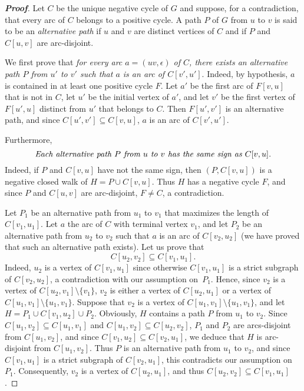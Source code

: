 \documentclass[11pt,a4paper]{article}
\def\e{\epsilon}
\begin{document}
\begin{proof}[{\bf Proof}]
Let $C$ be the unique negative cycle of $G$ and suppose, for a contradiction, that every arc of $C$ belongs to a positive cycle. A path $P$ of $G$ from $u$ to $v$ is said to be an {\em alternative path} if $u$ and $v$ are distinct vertices of $C$ and if $P$ and $C[u,v]$ are arc-disjoint. 

\medskip
We first prove that {\em for every arc $a=(uv,\e)$ of $C$, there exists an alternative path $P$ from $u'$ to $v'$ such that $a$ is an arc of $C[v',u']$}. Indeed, by hypothesis, $a$ is contained in at least one positive cycle $F$. Let $a'$ be the first arc of $F[v,u]$ that is not in $C$, let $u'$ be the initial vertex of $a'$, and let $v'$ be the first vertex of $F[u',u]$ distinct from $u'$ that belongs to $C$. Then $F[u',v']$ is an alternative path, and since $C[u',v']\subseteq C[v,u]$, $a$ is an arc of $C[v',u']$. 

\medskip
Furthermore, 
\begin{equation}\label{eq:sign}
{\text{\em Each alternative path $P$ from $u$ to $v$ has the same sign as $C[v,u]$.}}
\end{equation}
Indeed, if $P$ and $C[v,u]$ have not the same sign, then $(P,C[v,u])$ is a negative closed walk of $H=P\cup C[v,u]$. Thus $H$ has a negative cycle $F$, and since $P$ and $C[u,v]$ are arc-disjoint, $F\neq C$, a contradiction. 

\medskip

Let $P_1$ be an alternative path from $u_1$ to $v_1$ that maximizes the length of $C[v_1,u_1]$. Let $a$ the arc of $C$ with terminal vertex $v_1$, and let $P_2$ be an alternative path from $u_2$ to $v_2$ such that $a$ is an arc of $C[v_2,u_2]$ (we have proved that such an alternative path exists).  Let us prove that 
\[
C[u_2,v_2]\subseteq C[v_1,u_1].
\]
Indeed, $u_2$ is a vertex of $C[v_1,u_1]$ since otherwise $C[v_1,u_1]$ is a strict subgraph of $C[v_2,u_2]$, a contradiction with our assumption on~$P_1$. Hence, since $v_2$ is a vertex of $C[u_2,v_1]\setminus\{v_1\}$, $v_2$ is either a vertex of $C[u_2,u_1]$ or a vertex of $C[u_1,v_1]\setminus \{u_1,v_1\}$. Suppose that $v_2$ is a vertex of $C[u_1,v_1]\setminus \{u_1,v_1\}$, and let $H=P_1\cup C[v_1,u_2]\cup P_2$. Obviously, $H$ contains a path $P$ from $u_1$ to $v_2$. Since $C[u_1,v_2]\subseteq C[u_1,v_1]$ and $C[u_1,v_2]\subseteq C[u_2,v_2]$, $P_1$ and $P_2$ are arcs-disjoint from $C[u_1,v_2]$, and since $C[v_1,u_2]\subseteq C[v_2,u_1]$, we deduce that $H$ is arc-disjoint from $C[u_1,v_2]$. Thus $P$ is an alternative path from $u_1$ to $v_2$, and since $C[v_1,u_1]$ is a strict subgraph of $C[v_2,u_1]$, this contradicts our assumption on $P_1$. Consequently, $v_2$ is a vertex of $C[u_2,u_1]$, and thus $C[u_2,v_2]\subseteq C[v_1,u_1]$.


\end{proof}
\end{document}
